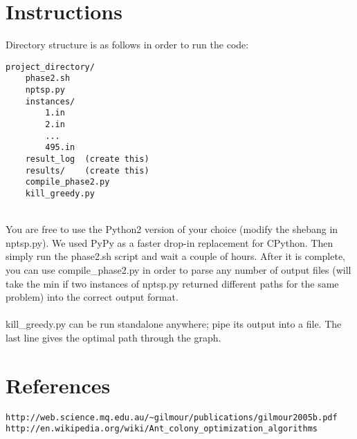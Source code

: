 \documentclass{article}
\begin{document}
\section*{Instructions}
Directory structure is as follows in order to run the code: \\
\begin{verbatim}
project_directory/
    phase2.sh
    nptsp.py
    instances/
        1.in
        2.in
        ...
        495.in
    result_log  (create this)
    results/    (create this)
    compile_phase2.py
    kill_greedy.py
\end{verbatim} \\
You are free to use the Python2 version of your choice (modify the shebang in nptsp.py). We used PyPy as a faster drop-in replacement for CPython. Then simply run the phase2.sh script and wait a couple of hours. After it is complete, you can use compile\_phase2.py in order to parse any number of output files (will take the min if two instances of nptsp.py returned different paths for the same problem) into the correct output format. \\\\
kill\_greedy.py can be run standalone anywhere; pipe its output into a file. The last line gives the optimal path through the graph. \\

\section*{References}
\begin{verbatim}
http://web.science.mq.edu.au/~gilmour/publications/gilmour2005b.pdf
http://en.wikipedia.org/wiki/Ant_colony_optimization_algorithms
\end{verbatim}
\end{document}
